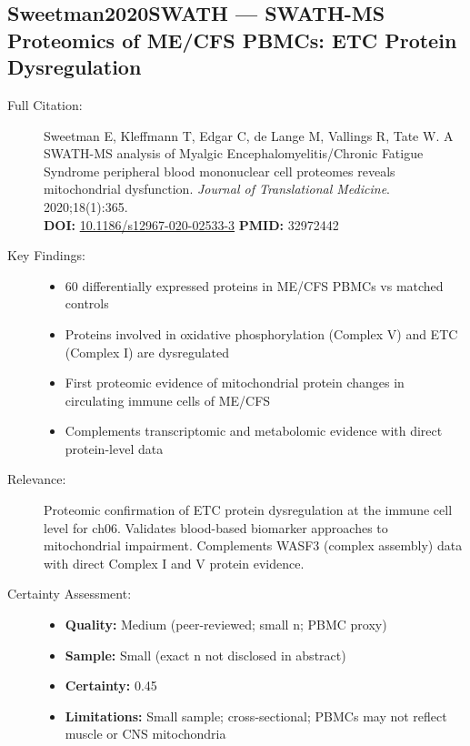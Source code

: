 \subsection*{Sweetman2020SWATH --- SWATH-MS Proteomics of ME/CFS PBMCs: ETC Protein Dysregulation}
\begin{description}
    \item[Full Citation:] Sweetman E, Kleffmann T, Edgar C, de Lange M, Vallings R, Tate W. A SWATH-MS analysis of Myalgic Encephalomyelitis/Chronic Fatigue Syndrome peripheral blood mononuclear cell proteomes reveals mitochondrial dysfunction. \textit{Journal of Translational Medicine}. 2020;18(1):365.\\
    \textbf{DOI:} \href{https://doi.org/10.1186/s12967-020-02533-3}{10.1186/s12967-020-02533-3} \quad \textbf{PMID:} 32972442
    \item[Key Findings:]
    \begin{itemize}
        \item 60 differentially expressed proteins in ME/CFS PBMCs vs matched controls
        \item Proteins involved in oxidative phosphorylation (Complex V) and ETC (Complex I) are dysregulated
        \item First proteomic evidence of mitochondrial protein changes in circulating immune cells of ME/CFS
        \item Complements transcriptomic and metabolomic evidence with direct protein-level data
    \end{itemize}
    \item[Relevance:] Proteomic confirmation of ETC protein dysregulation at the immune cell level for ch06. Validates blood-based biomarker approaches to mitochondrial impairment. Complements WASF3 (complex assembly) data with direct Complex I and V protein evidence.
    \item[Certainty Assessment:]
    \begin{itemize}
        \item \textbf{Quality:} Medium (peer-reviewed; small n; PBMC proxy)
        \item \textbf{Sample:} Small (exact n not disclosed in abstract)
        \item \textbf{Certainty:} 0.45
        \item \textbf{Limitations:} Small sample; cross-sectional; PBMCs may not reflect muscle or CNS mitochondria
    \end{itemize}
\end{description}

